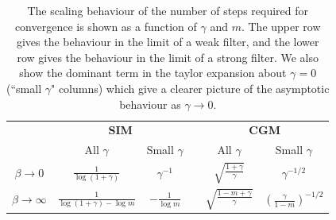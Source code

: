 \begin{table}[h]
    \centering
    \def\arraystretch{1.5}
    \begin{tabular}{@{}cccccc}
    \toprule
    & \multicolumn{2}{c}{\textbf{SIM}} & \phantom{abc}& \multicolumn{2}{c}{\textbf{CGM}} \\
    \cmidrule{2-3} \cmidrule{5-6}
                               & All $\gamma$   & Small $\gamma$   &&  All $\gamma$   & Small $\gamma$ \\ \midrule \rule{0pt}{1cm}
    $\beta \rightarrow 0$      & $ \displaystyle \frac{1}{\log(1 + \gamma)}$   & $\displaystyle \gamma^{-1}$    &&    $\displaystyle \sqrt{\frac{1 + \gamma}{\gamma}}$ & $\displaystyle \gamma^{-1/2}$    \\ \rule{0pt}{6ex}
    $\beta \rightarrow \infty$ & $\displaystyle \frac{1}{\log(1 + \gamma) - \log m}$ & $\displaystyle -\frac{1}{\log m}$    &&  $\displaystyle \sqrt{\frac{1 - m + \gamma}{\gamma}}$ & $\displaystyle \left(\frac{\gamma}{1 - m} \right)^{-1/2}$ \\[0.5cm] \bottomrule 
    \end{tabular}
    \caption{The scaling behaviour of the number of steps required for convergence is shown as a function of $\gamma$ and $m$. The upper row gives the behaviour in the limit of a weak filter, and the lower row gives the behaviour in the limit of a strong filter. We also show the dominant term in the taylor expansion about $\gamma=0$ (``small $\gamma$" columns) which give a clearer picture of the asymptotic behaviour as $\gamma \rightarrow 0$. }
    \label{tab:conv_SIM_CGM} 
\end{table}



    





